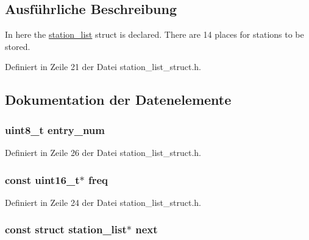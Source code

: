 \subsection{Ausführliche Beschreibung}
In here the \hyperlink{structstation__list}{station\+\_\+list} struct is declared. There are 14 places for stations to be stored. 

Definiert in Zeile 21 der Datei station\+\_\+list\+\_\+struct.\+h.



\subsection{Dokumentation der Datenelemente}
\hypertarget{structstation__list_aab8c201217e885e0ee4e61820a289c0c}{}
\subsubsection[{entry\+\_\+num}]{\setlength{\rightskip}{0pt plus 5cm}uint8\+\_\+t entry\+\_\+num}\label{structstation__list_aab8c201217e885e0ee4e61820a289c0c}


Definiert in Zeile 26 der Datei station\+\_\+list\+\_\+struct.\+h.

\hypertarget{structstation__list_a0c8c7380b4e3197fe0b821b4a6dfbec9}{}
\subsubsection[{freq}]{\setlength{\rightskip}{0pt plus 5cm}const uint16\+\_\+t$\ast$ freq}\label{structstation__list_a0c8c7380b4e3197fe0b821b4a6dfbec9}


Definiert in Zeile 24 der Datei station\+\_\+list\+\_\+struct.\+h.

\hypertarget{structstation__list_aaf7e88858b6e1e91f04c50ce118be602}{}
\subsubsection[{next}]{\setlength{\rightskip}{0pt plus 5cm}const struct {\bf station\+\_\+list}$\ast$ next}\label{structstation__list_aaf7e88858b6e1e91f04c50ce118be602}


